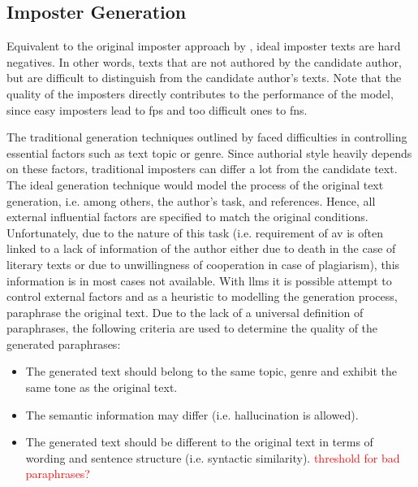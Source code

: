 \subsection{Imposter Generation}
\label{subsec:imposter_generation}

Equivalent to the original imposter approach by \citet{koppel_determining_2014}, ideal imposter texts are hard negatives.
In other words, texts that are not authored by the candidate author, but are difficult to distinguish from the candidate author's texts.
Note that the quality of the imposters directly contributes to the performance of the model, 
since easy imposters lead to \acp{fp} and too difficult ones to \acp{fn}.

The traditional generation techniques outlined by \citet{koppel_determining_2014} faced difficulties in controlling essential factors such as text topic or genre.
Since authorial style heavily depends on these factors, traditional imposters can differ a lot from the candidate text.
The ideal generation technique would model the process of the original text generation, 
i.e. among others, the author's task, and references.
Hence, all external influential factors are specified to match the original conditions.
Unfortunately, due to the nature of this task 
(i.e. requirement of \ac{av} is often linked to a lack of information of the author either due to death in the case of literary texts or 
due to unwillingness of cooperation in case of plagiarism), this information is in most cases not available.
With \acp{llm} it is possible attempt to control external factors and 
as a heuristic to modelling the generation process, paraphrase the original text.
Due to the lack of a universal definition of paraphrases, the following criteria are used to determine the quality of the generated paraphrases:
\begin{itemize}
    \item The generated text should belong to the same topic, genre and exhibit the same tone as the original text.
    \item The semantic information may differ (i.e. hallucination is allowed).
    \item The generated text should be different to the original text in terms of wording and sentence structure (i.e. syntactic similarity). \textcolor{red}{threshold for bad paraphrases?}
\end{itemize}


